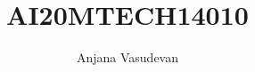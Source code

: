 \documentclass[journal,12pt,twocolumn]{IEEEtran}
\begin{document}
\makeatletter
{}
\makeatother
\let\StandardTheFigure\thefigure
\let\vec\mathbf
\renewcommand{\thefigure}{\theproblem}
\def\putbox#1#2#3{\makebox[0in][l]{\makebox[#1][l]{}\raisebox{\baselineskip}[0in][0in]{\raisebox{#2}[0in][0in]{#3}}}}
     \def\rightbox#1{\makebox[0in][r]{#1}}
     \def\centbox#1{\makebox[0in]{#1}}
     \def\topbox#1{\raisebox{-\baselineskip}[0in][0in]{#1}}
     \def\midbox#1{\raisebox{-0.5\baselineskip}[0in][0in]{#1}}
\vspace{3cm}
\title{AI20MTECH14010}
\author{Anjana Vasudevan}
%
%
%
%
%
\end{document}
